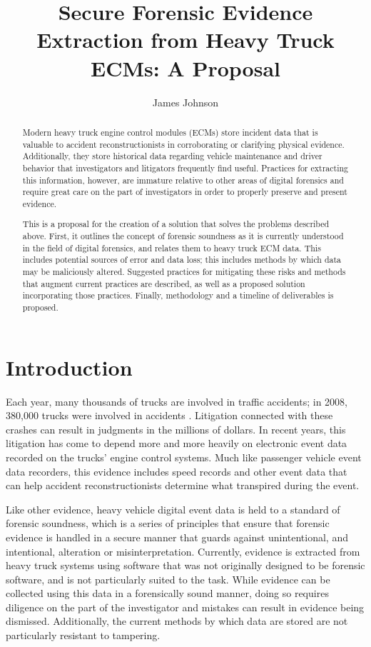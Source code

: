 \documentclass{report}
\title{Secure Forensic Evidence Extraction from Heavy Truck ECMs: A Proposal}
\author{James Johnson}
\begin{document}
\maketitle

\begin{abstract}
Modern heavy truck engine control modules (ECMs) store incident data that is valuable to accident reconstructionists in corroborating or clarifying physical evidence. Additionally, they store historical data regarding vehicle maintenance and driver behavior that investigators and litigators frequently find useful. Practices for extracting this information, however, are immature relative to other areas of digital forensics and require great care on the part of investigators in order to properly preserve and present evidence.

This is a proposal for the creation of a solution that solves the problems described above. First, it
outlines the concept of forensic soundness as it is currently understood in the field of digital forensics, and relates 
them to heavy truck ECM data. This includes potential sources of error and data loss; this includes methods by which data may be maliciously 
altered. Suggested practices for mitigating these risks and methods that augment current practices are described, as well as a proposed solution
incorporating those practices. Finally, methodology and a timeline of deliverables is proposed.
\end{abstract}

\chapter{Introduction}
Each year, many thousands of trucks are involved in traffic accidents; in 2008, 380,000 trucks were involved in accidents \cite{NHTSA2008}.
Litigation connected with these crashes can result in judgments in the millions of dollars. In recent years, this litigation has 
come to depend more and more heavily on electronic event data recorded on the trucks' engine control systems. Much like passenger 
vehicle event data recorders, this evidence includes speed records and other event data that can help accident reconstructionists 
determine what transpired during the event.

Like other evidence, heavy vehicle digital event data is held to a standard of forensic soundness, which is a series of principles 
that ensure that forensic evidence is handled in a secure manner that guards against unintentional, and intentional, alteration or 
misinterpretation. Currently, evidence is extracted from heavy truck systems using software that was not originally designed to be 
forensic software, and is not particularly suited to the task. While evidence can be collected using this data in a forensically sound 
manner, doing so requires diligence on the part of the investigator and mistakes can result in evidence being dismissed. Additionally, 
the current methods by which data are stored are not particularly resistant to tampering. 
\end{document}
